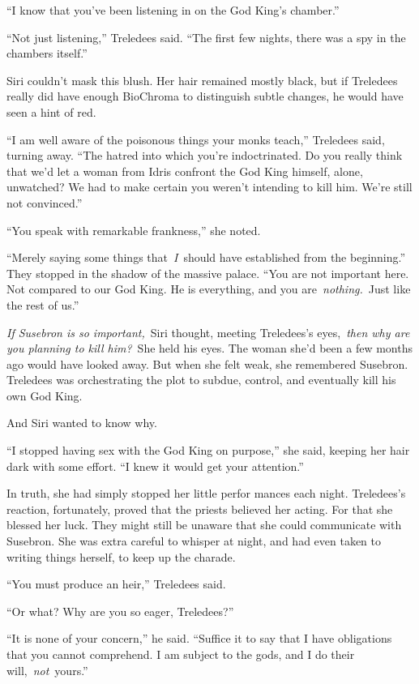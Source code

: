 “I know that you’ve been listening in on the God King’s chamber.”

“Not just listening,” Treledees said. “The first few nights, there was a spy in the chambers itself.”

Siri couldn’t mask this blush. Her hair remained mostly black, but if Treledees really did have enough BioChroma to distinguish subtle changes, he would have seen a hint of red.

“I am well aware of the poisonous things your monks teach,” Treledees said, turning away. “The hatred into which you’re indoctrinated. Do you really think that we’d let a woman from Idris confront the God King himself, alone, unwatched? We had to make certain you weren’t intending to kill him. We’re still not convinced.”

“You speak with remarkable frankness,” she noted.

“Merely saying some things that~\textit{I}~should have established from the beginning.” They stopped in the shadow of the massive palace. “You are not important here. Not compared to our God King. He is everything, and you are~\textit{nothing.}~Just like the rest of us.”

\textit{If Susebron is so important,}~Siri thought, meeting Treledees’s eyes,~\textit{then why are you planning to kill him?}~She held his eyes. The woman she’d been a few months ago would have looked away. But when she felt weak, she remembered Susebron. Treledees was orchestrating the plot to subdue, control, and eventually kill his own God King.

And Siri wanted to know why.

“I stopped having sex with the God King on purpose,” she said, keeping her hair dark with some effort. “I knew it would get your attention.”

In truth, she had simply stopped her little perfor mances each night. Treledees’s reaction, fortunately, proved that the priests believed her acting. For that she blessed her luck. They might still be unaware that she could communicate with Susebron. She was extra careful to whisper at night, and had even taken to writing things herself, to keep up the charade.

“You must produce an heir,” Treledees said.

“Or what? Why are you so eager, Treledees?”

“It is none of your concern,” he said. “Suffice it to say that I have obligations that you cannot comprehend. I am subject to the gods, and I do their will,~\textit{not}~yours.”

